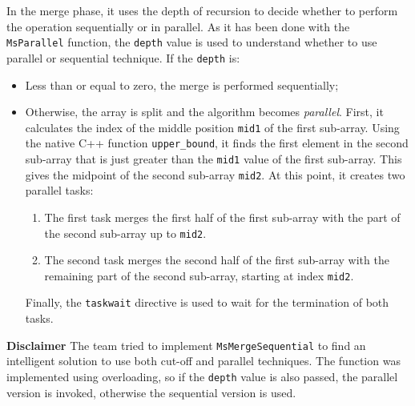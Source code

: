 \documentclass[a4paper]{article}
\begin{document}
    \begin{optionalbox}
        In the merge phase, it uses the depth of recursion to decide whether to perform the operation sequentially or in parallel. As it has been done with the \texttt{MsParallel} function, the \texttt{depth} value is used to understand whether to use parallel or sequential technique. If the \texttt{depth} is:
        \begin{itemize}
            \item Less than or equal to zero, the merge is performed sequentially;
            \item Otherwise, the array is split and the algorithm becomes \emph{parallel}. First, it calculates the index of the middle position \texttt{mid1} of the first sub-array. Using the native C++ function \texttt{upper\_bound}, it finds the first element in the second sub-array that is just greater than the \texttt{mid1} value of the first sub-array. This gives the midpoint of the second sub-array \texttt{mid2}. At this point, it creates two parallel tasks:
            \begin{enumerate}
                \item The first task merges the first half of the first sub-array with the part of the second sub-array up to \texttt{mid2}.
                \item The second task merges the second half of the first sub-array with the remaining part of the second sub-array, starting at index \texttt{mid2}.
            \end{enumerate}
            Finally, the \texttt{taskwait} directive is used to wait for the termination of both tasks.
        \end{itemize}
    \end{optionalbox}
    \noindent
    \textcolor{Red3}{ \textbf{Disclaimer}} The team tried to implement \texttt{MsMergeSequential} to find an intelligent solution to use both cut-off and parallel techniques. The function was implemented using overloading, so if the \texttt{depth} value is also passed, the parallel version is invoked, otherwise the sequential version is used.
\end{document}
